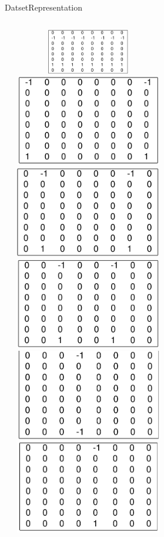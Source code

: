 \documentclass[9pt, unknownkeysallowed]{beamer}
\begin{document}
\begin{frame}{Datset}{Representation}
\begin{columns}
\begin{column}{3.7cm}
  \end{column}
  \begin{column}{6.3cm}
  \includegraphics[width=0.5\textwidth, height=2.0cm]{../img/channel1.png}
  \includegraphics[width=0.5\textwidth]{../img/channel2.png}\\
    \includegraphics[width=0.5\textwidth]{../img/channel3.png}
  \includegraphics[width=0.5\textwidth]{../img/channel4.png}\\
    \includegraphics[width=0.5\textwidth]{../img/channel5.png}
  \includegraphics[width=0.5\textwidth]{../img/channel6.png}
  \end{column}


\end{columns}
\end{frame}
\end{document}
